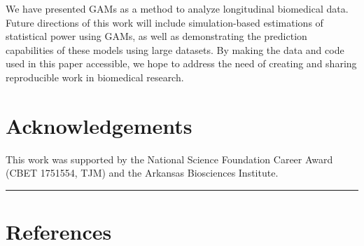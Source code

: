 \documentclass[
]{article}
\begin{document}
We have presented GAMs as a method to analyze longitudinal biomedical data. Future directions of this work will include simulation-based estimations of statistical power using GAMs, as well as demonstrating the prediction capabilities of these models using large datasets.
By making the data and code used in this paper accessible, we hope to address the need of creating and sharing reproducible work in biomedical research.

\hypertarget{acknowledgements}{%
\section{Acknowledgements}\label{acknowledgements}}

This work was supported by the National Science Foundation Career Award (CBET 1751554, TJM) and the Arkansas Biosciences Institute.

\FloatBarrier

\begin{center}\rule{0.5\linewidth}{0.5pt}\end{center}

\newpage

\hypertarget{references}{%
\section{References}\label{references}}
\end{document}
